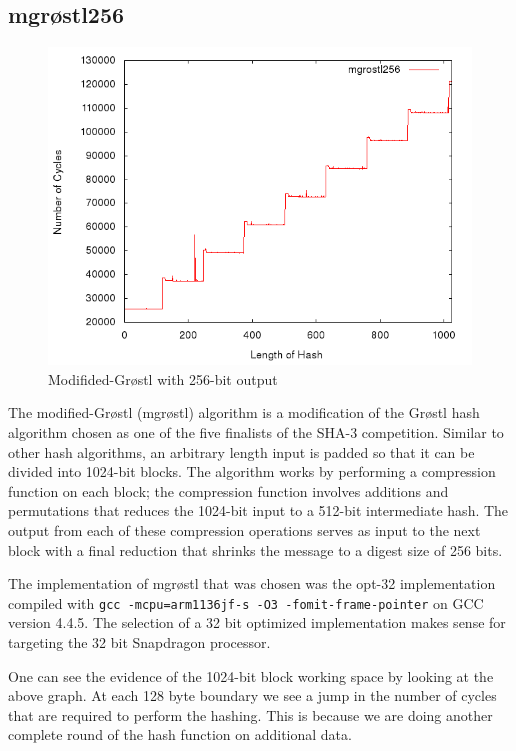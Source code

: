 \documentclass[10pt,a4paper]{article}
\begin{document}
\subsection{mgr{\o}stl256}
\begin{figure}[H]
    \begin{center}
        \includegraphics[scale=0.5]{images/mgrostl256.png} 
        \caption{Modifided-Gr{\o}stl with 256-bit output}
    \end{center}
\end{figure}

The modified-Gr{\o}stl (mgr{\o}stl) algorithm is a modification of the Gr{\o}stl
hash algorithm chosen as one of the five finalists of the SHA-3 competition.
Similar to other hash algorithms, an arbitrary length input is padded so that it
can be divided into 1024-bit blocks.  The algorithm works by performing a
compression function on each block; the compression function involves additions
and permutations that reduces the 1024-bit input to a 512-bit intermediate hash.
The output from each of these compression operations serves as input to the next
block with a final reduction that shrinks the message to a digest size of 256
bits. 

The implementation of mgr{\o}stl that was chosen was the opt-32 implementation
compiled with \texttt{gcc -mcpu=arm1136jf-s -O3 -fomit-frame-pointer} on GCC
version 4.4.5. The selection of a 32 bit optimized implementation makes sense
for targeting the 32 bit Snapdragon processor.

One can see the evidence of the 1024-bit block working space by looking at the
above graph. At each 128 byte boundary we see a jump in the number of cycles
that are required to perform the hashing. This is because we are doing another
complete round of the hash function on additional data.
\end{document}
